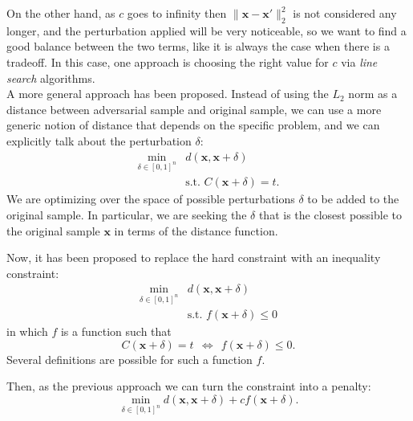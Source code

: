 On the other hand, as $c$ goes to infinity then $\|\mathbf{x} - \mathbf{x'}\|^2_2$ is not considered any longer, and the perturbation applied will be very noticeable, so we want to find a good balance between the two terms, like it is always the case when there is a tradeoff. In this case, one approach is choosing the right value for $c$ via \emph{line search} algorithms.
\\

A more general approach has been proposed. Instead of using the $L_2$ norm as a distance between adversarial sample and original sample, we can use a more generic notion of distance that depends on the specific problem, and we can explicitly talk about the perturbation $\delta$:
\begin{align}
	\min_{\delta \in [0,1]^n}& d(\mathbf{x}, \mathbf{x}+\delta) \\
	&\text{s.t. } C(\mathbf{x}+\delta) = t.
\end{align}
We are optimizing over the space of possible perturbations $\delta$ to be added to the original sample. In particular, we are seeking the $\delta$ that is the closest possible to the original sample $\mathbf{x}$ in terms of the distance function.

Now, it has been proposed to replace the hard constraint with an inequality constraint:
\begin{align}
	\min_{\delta \in [0,1]^n}& d(\mathbf{x}, \mathbf{x}+\delta) \\
	&\text{s.t. } f(\mathbf{x}+\delta) \leq 0
\end{align}
in which $f$ is a function such that
\begin{equation}
    C(\mathbf{x} + \delta) = t ~~ \iff ~~ f(\mathbf{x} + \delta) \leq 0.
\end{equation}
Several definitions are possible for such a function $f$.

Then, as the previous approach we can turn the constraint into a penalty:
\begin{equation}
	\min_{\delta \in [0,1]^n} d(\mathbf{x}, \mathbf{x}+\delta) + cf(\mathbf{x}+\delta).
\end{equation}

